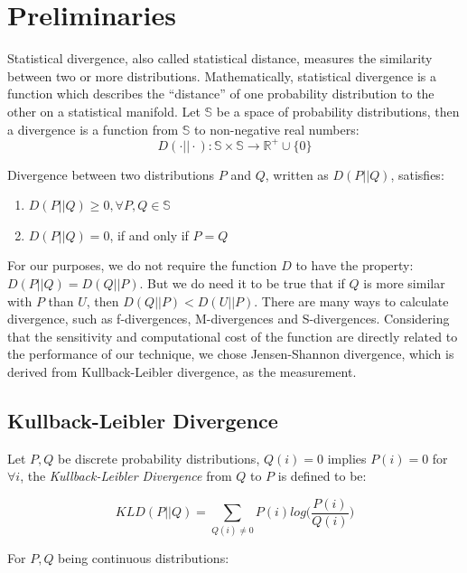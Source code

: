 \documentclass[10pt,conference,letterpaper]{IEEEtran}
\begin{document}
	
	\section{Preliminaries}\label{sec:preliminaries}
		Statistical divergence, also called statistical distance, measures the similarity between two or more distributions.
		Mathematically, statistical divergence is a function which describes the ``distance'' of one probability distribution to the other on a statistical manifold. Let $\mathbb{S}$ be a space of probability distributions, then a divergence is a function from $\mathbb{S}$ to non-negative real numbers: 
		\begin{equation}
			D(\cdot || \cdot): \mathbb{S} \times \mathbb{S} \rightarrow \mathbb{R^+} \cup \{0\}
		\end{equation}
	
		Divergence between two distributions $P$ and $Q$, written as $D(P||Q)$, satisfies:
	
		\begin{enumerate}
			\item $D(P||Q) \ge 0, \forall P, Q \in \mathbb{S}$
			\item $D(P||Q) = 0$, if and only if $P=Q$
		\end{enumerate}
	
		For our purposes, we do not require the function $D$ to have the property: $D(P||Q) = D(Q||P)$. But we do need it to be true that if $Q$ is more similar with $P$ than $U$, then $D(Q||P) < D(U||P)$. There are many ways to calculate divergence, such as f-divergences, M-divergences and S-divergences.
		Considering that the sensitivity and computational cost of the function are directly related to the performance of our technique, we chose Jensen-Shannon divergence, which is derived from Kullback-Leibler divergence, as the measurement.
	
		\subsection{Kullback-Leibler Divergence}
			Let $P,Q$ be discrete probability distributions, $Q(i)=0$ implies $P(i)=0$ for $\forall i$, the \textit{Kullback-Leibler Divergence} from $Q$ to $P$ is defined to be:
	
			\begin{equation}
				KLD(P||Q) = \sum_{Q(i)\ne 0} P(i)log\Big(\frac{P(i)}{Q(i)}\Big)
			\end{equation}
	
			For $P,Q$ being continuous distributions:
	
\end{document}
